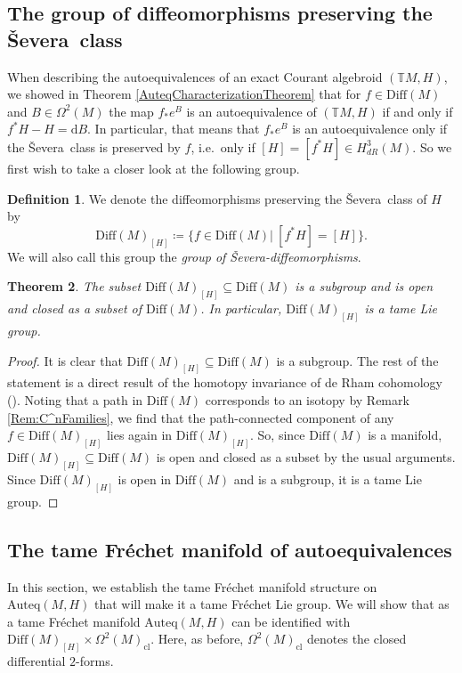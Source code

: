 \documentclass[12pt,a4paper]{article}
\theoremstyle{plain}
\newtheorem{theorem}{Theorem}[subsection]
\theoremstyle{definition}
\newtheorem{definition}[theorem]{Definition}
\newcommand{\Forms}[1]{\Omega^{#1}(M)}
\newcommand{\ClForms}[1]{\Forms{#1}_{\mathrm{cl}}}
\newcommand{\Diff}{\mathrm{Diff}(M)}
\newcommand{\SDiff}{\mathrm{Diff}(M)_{[H]}}
\newcommand{\Auteq}{\mathrm{Auteq}(M,H)}
\newcommand{\Severa}{\v{S}evera}
\newcommand{\GenTM}{\mathbb TM}
\renewcommand{\d}{\mathrm{d}}
\begin{document}
\subsection{The group of diffeomorphisms preserving the \Severa\ class}

When describing the autoequivalences of an exact Courant algebroid $(\GenTM,H)$, we showed in Theorem \ref{AuteqCharacterizationTheorem} that for $f\in \Diff$ and $B\in \Forms{2}$ the map $f_*e^B$ is an autoequivalence of $(\GenTM,H)$ if and only if $f^*H-H=\d B$. In particular, that means that $f_*e^B$ is an autoequivalence only if the \Severa\ class is preserved by $f$, i.e.~only if
$[H]=[f^*H]\in H_{dR}^3(M)$.
So we first wish to take a closer look at the following group.

\begin{definition}
We denote the diffeomorphisms preserving the \Severa\ class of $H$ by 
\begin{equation*}
    \SDiff\coloneqq \{f\in \mathrm{Diff}(M)|~[f^*H]=[H]\}.
\end{equation*}
We will also call this group the \textit{group of \Severa-diffeomorphisms}.
\end{definition}



\begin{theorem}
\label{Thm:SDiffClopen}
The subset $\SDiff\subseteq \Diff$ is a subgroup and is open and closed as a subset of $\Diff$. In particular, $\SDiff$ is a tame Lie group. 
\end{theorem}
\begin{proof}
It is clear that $\SDiff\subseteq \Diff$ is a subgroup.
The rest of the statement is a direct result of the homotopy invariance of de Rham cohomology (\cite[Proposition 17.10]{Lee2003}). Noting that a path in $\Diff$ corresponds to an isotopy by Remark \ref{Rem:C^nFamilies}, we find that the path-connected component of any $f\in \SDiff$ lies again in $\SDiff$. So, since $\Diff$ is a manifold, $\SDiff\subseteq \Diff$ is open and closed as a subset by the usual arguments. Since $\SDiff$ is open in $\Diff$ and is a subgroup, it is a tame Lie group.
\end{proof}





\subsection{The tame Fréchet manifold of autoequivalences}
In this section, we establish the tame Fréchet manifold structure on $\Auteq$ that will make it a tame Fréchet Lie group. We will show that as a tame Fréchet manifold $\Auteq$ can be identified with $\SDiff\times \ClForms{2}$. Here, as before, $\ClForms{2}$ denotes the closed differential $2$-forms.
\end{document}

